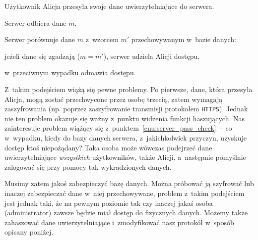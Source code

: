 \documentclass[12pt,a4paper,twoside]{article}
\begin{document}
\begin{myenumerate}

    \item Użytkownik Alicja przesyła swoje dane uwierzytelniające do serwera.

    \item Serwer odbiera dane $m$.

    \item Serwer porównuje dane $m$ z~wzorcem $m'$ przechowywanym w~bazie
    danych: \label{enu:server_pass_check}

    \begin{myenumerate}

        \item jeżeli dane się zgadzają ($m = m'$), serwer udziela Alicji
        dostępu,

        \item w~przeciwnym wypadku odmawia dostępu.

    \end{myenumerate}

\end{myenumerate}

Z~takim podejściem wiążą się pewne problemy. Po pierwsze, dane, która przesyła
Alicja, mogą zostać przechwycone przez osobę trzecią, zatem wymagają
zaszyfrowania (np. poprzez zaszyfrowanie transmisji protokołem \texttt{HTTPS}).
Jednak nie ten problem okazuje się ważny z~punktu widzenia funkcji haszujących.
Nas zainteresuje problem wiążący się z~punktem~\ref{enu:server_pass_check}~--
co w~wypadku, kiedy do bazy danych serwera, z~jakichkolwiek przyczyn, uzyskuje
dostęp ktoś niepożądany? Taka osoba może wówczas podejrzeć dane
uwierzytelniające \emph{wszystkich} użytkowników, także Alicji, a~następnie
pomyślnie zalogować się przy pomocy tak wykradzionych danych.

Musimy zatem jakoś zabezpieczyć bazę danych. Można próbować ją szyfrować lub
inaczej zabezpieczać dane w~niej przechowywane, problem z~takim podejściem jest
jednak taki, że na pewnym poziomie tak czy inaczej jakaś osoba (administrator)
zawsze będzie miał dostęp do fizycznych danych. Możemy także zahaszować dane
uwierzytelniające i~zmodyfikować nasz protokół w~sposób opisany poniżej.
\end{document}
